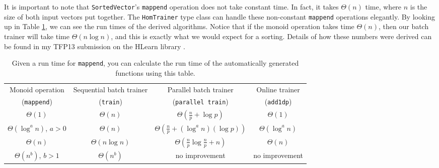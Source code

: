 \documentclass[tikz]{tmr}
\newcommand\h{\lstinline}
\newcommand\+{\mdoubleplus}
\begin{document}
It is important to note that \h{SortedVector}'s \h{mappend} operation does not take constant time.
In fact, it takes $\Theta(n)$ time, where $n$ is the size of both input vectors put together.
The \h{HomTrainer} type class can handle these non-constant \h{mappend} operations elegantly.
By looking up in Table \ref{table:rt}, we can see the run times of the derived algorithms.
Notice that if the monoid operation takes time $\Theta(n)$, then our batch trainer will take time $\Theta(n\log n)$, and this is exactly what we would expect for a sorting.
Details of how these numbers were derived can be found in my TFP13 submission on the HLearn library \cite{me_tfp13}.

\begin{table}[H]
\caption{Given a run time for \h{mappend}, you can calculate the run time of the automatically generated functions using this table.}
\label{table:rt}
\hspace{-0.3in}
\begin{tabular}{ c c c c }
\hline
Monoid operation & Sequential batch trainer & \ \ Parallel batch trainer\ \ & Online trainer\\
\mbox{(\h{mappend})} & \mbox{(\h{train})} & \mbox{(\h{parallel train})} & \mbox{(\h{add1dp})}\\
\hline \hline
$\Theta(1)$ & $\Theta(n)$ & $\Theta\left(\frac{n}{p}+\log p\right)$ & $\Theta(1)$ \\
$\Theta(\log^a n)$, $a>0$ & $\Theta(n)$ & $\Theta\left(\frac{n}{p}+(\log^a n)(\log p)\right)$ & $\Theta(\log^a n)$ \\
$\Theta(n)$ & $\Theta(n\log n)$ & $\Theta\left(\frac{n}{p}\log\frac{n}{p}+n\right)$ & $\Theta(n)$ \\
$\Theta(n^b)$, $b>1$ & $\Theta(n^b)$ & no improvement & no improvement\\
\hline
\end{tabular}
\end{table}
\end{document}
